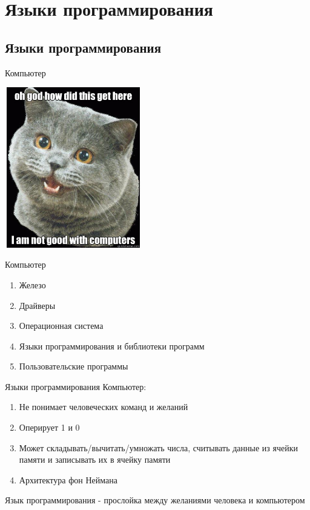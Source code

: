 \documentclass[10pt]{beamer}
\begin{document}
\section{Языки программирования}
\subsection{Языки программирования}
\begin{frame}{Компьютер}
\begin{center}
\includegraphics[width=6cm, height=7cm]{Term_1/Source/Pirctures/not_good.jpg}
\end{center}
\end{frame}

\begin{frame}{Компьютер}
\begin{enumerate}
    \item Железо
    \item Драйверы
    \item Операционная система
    \item Языки программирования и библиотеки программ
    \item Пользовательские программы
\end{enumerate}
\end{frame}

\begin{frame}{Языки программирования}
Компьютер:
\begin{enumerate}
    \item Не понимает человеческих команд и желаний
    \item Оперирует 1 и 0
    \item Может складывать/вычитать/умножать числа, считывать данные из ячейки памяти и записывать их в ячейку памяти
    \item Архитектура фон Неймана
\end{enumerate}

Язык программирования - прослойка между желаниями человека и компьютером
\end{frame}
\end{document}
